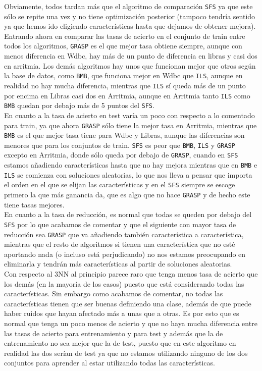 \documentclass[12pt]{article}
\begin{document}
Obviamente, todos tardan más que el algoritmo de comparación \texttt{SFS} ya que este sólo se repite una vez y no tiene optimización posterior (tampoco tendría sentido ya que hemos ido eligiendo características hasta que dejamos de obtener mejora).\\

Entrando ahora en comparar las tasas de acierto en el conjunto de train entre todos los algoritmos, \texttt{GRASP} es el que mejor tasa obtiene siempre, aunque con menos diferencia en Wdbc, hay más de un punto de diferencia en libras y casi dos en arritmia. Los demás algoritmos hay unos que funcionan mejor que otros según la base de datos, como \texttt{BMB}, que funciona mejor en Wdbc que \texttt{ILS}, aunque en realidad no hay mucha diferencia, mientras que \texttt{ILS} sí queda más de un punto por encima en Libras casi dos en Arritmia, aunque en Arritmia tanto \texttt{ILS} como \texttt{BMB} quedan por debajo más de 5 puntos del \texttt{SFS}.\\

En cuanto a la tasa de acierto en test varía un poco con respecto a lo comentado para train, ya que ahora \texttt{GRASP} sólo tiene la mejor tasa en Arritmia, mientras que \texttt{BMB} es el que mejor tasa tiene para Wdbc y Libras, aunque las diferencias son menores que para los conjuntos de train. \texttt{SFS} es peor que \texttt{BMB}, \texttt{ILS} y \texttt{GRASP} excepto en Arritmia, donde sólo queda por debajo de \texttt{GRASP}, cuando en \texttt{SFS} estamos añadiendo características hasta que no hay mejora mientras que en \texttt{BMB} e \texttt{ILS} se comienza con soluciones aleatorias, lo que nos lleva a pensar que importa el orden en el que se elijan las características y en el \texttt{SFS} siempre se escoge primero la que más ganancia da, que es algo que no hace \texttt{GRASP} y de hecho este tiene tasas mejores.\\

En cuanto a la tasa de reducción, es normal que todas se queden por debajo del \texttt{SFS} por lo que acabamos de comentar y que el siguiente con mayor tasa de reducción sea \texttt{GRASP} que va añadiendo también característica a característica, mientras que el resto de algoritmos si tienen una característica que no esté aportando nada (o incluso está perjudicando) no nos estamos preocupando en eliminarla y tendrán más características al partir de soluciones aleatorias.\\

Con respecto al 3NN al principio parece raro que tenga menos tasa de acierto que los demás (en la mayoría de los casos) puesto que está considerando todas las características. Sin embargo como acabamos de comentar, no todas las características tienen que ser buenas definiendo una clase, además de que puede haber ruidos que hayan afectado más a unas que a otras. Es por esto que es normal que tenga un poco menos de acierto y que no haya mucha diferencia entre las tasas de acierto para entrenamiento y para test y además que la de entrenamiento no sea mejor que la de test, puesto que en este algoritmo en realidad las dos serían de test ya que no estamos utilizando ninguno de los dos conjuntos para aprender al estar utilizando todas las características.\\
\end{document}
